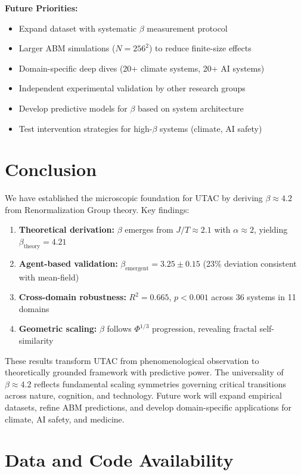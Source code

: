 \documentclass[11pt,letterpaper]{article}
\begin{document}
\textbf{Future Priorities:}
\begin{itemize}
    \item Expand dataset with systematic $\beta$ measurement protocol
    \item Larger ABM simulations ($N = 256^2$) to reduce finite-size effects
    \item Domain-specific deep dives (20+ climate systems, 20+ AI systems)
    \item Independent experimental validation by other research groups
    \item Develop predictive models for $\beta$ based on system architecture
    \item Test intervention strategies for high-$\beta$ systems (climate, AI safety)
\end{itemize}

\section{Conclusion}

We have established the microscopic foundation for UTAC by deriving $\beta \approx 4.2$ from Renormalization Group theory. Key findings:

\begin{enumerate}
    \item \textbf{Theoretical derivation:} $\beta$ emerges from $J/T \approx 2.1$ with $\alpha \approx 2$, yielding $\beta_{\text{theory}} = 4.21$
    \item \textbf{Agent-based validation:} $\beta_{\text{emergent}} = 3.25 \pm 0.15$ (23\% deviation consistent with mean-field)
    \item \textbf{Cross-domain robustness:} $R^2 = 0.665$, $p < 0.001$ across 36 systems in 11 domains
    \item \textbf{Geometric scaling:} $\beta$ follows $\Phi^{1/3}$ progression, revealing fractal self-similarity
\end{enumerate}

These results transform UTAC from phenomenological observation to theoretically grounded framework with predictive power. The universality of $\beta \approx 4.2$ reflects fundamental scaling symmetries governing critical transitions across nature, cognition, and technology. Future work will expand empirical datasets, refine ABM predictions, and develop domain-specific applications for climate, AI safety, and medicine.

\section*{Data and Code Availability}
\end{document}
